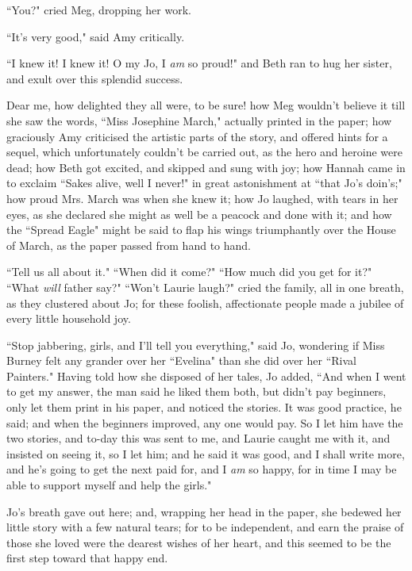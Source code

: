 ``You?" cried Meg, dropping her work.

``It's very good," said Amy critically.

``I knew it! I knew it! O my Jo, I \emph{am} so proud!" and Beth ran to
hug her sister, and exult over this splendid success.

Dear me, how delighted they all were, to be sure! how Meg
wouldn't believe it till she saw the words, ``Miss
Josephine March," actually printed in the paper; how graciously Amy
criticised the artistic parts of the story, and offered hints for a
sequel, which unfortunately couldn't be carried out, as
the hero and heroine were dead; how Beth got excited, and skipped and
sung with joy; how Hannah came in to exclaim ``Sakes alive, well I
never!" in great astonishment at ``that Jo's
doin's;" how proud Mrs. March was when she knew it; how
Jo laughed, with tears in her eyes, as she declared she might as well be
a peacock and done with it; and how the ``Spread Eagle" might be said to
flap his wings triumphantly over the House of March, as the paper passed
from hand to hand.

``Tell us all about it." ``When did it come?" ``How much did you get for
it?" ``What \emph{will} father say?" ``Won't Laurie
laugh?" cried the family, all in one breath, as they clustered about Jo;
for these foolish, affectionate people made a jubilee of every little
household joy.

``Stop jabbering, girls, and I'll tell you everything,"
said Jo, wondering if Miss Burney felt any grander over her ``Evelina"
than she did over her ``Rival Painters." Having told how she disposed of
her tales, Jo added, ``And when I went to get my answer, the man said he
liked them both, but didn't pay beginners, only let them
print in his paper, and noticed the stories. It was good practice, he
said; and when the beginners improved, any one would pay. So I let him
have the two stories, and to-day this was sent to me, and Laurie caught
me with it, and insisted on seeing it, so I let him; and he said it was
good, and I shall write more, and he's going to get the
next paid for, and I \emph{am} so happy, for in time I may be able to
support myself and help the girls."

Jo's breath gave out here; and, wrapping her head in the
paper, she bedewed her little story with a few natural tears; for to be
independent, and earn the praise of those she loved were the dearest
wishes of her heart, and this seemed to be the first step toward that
happy end.
